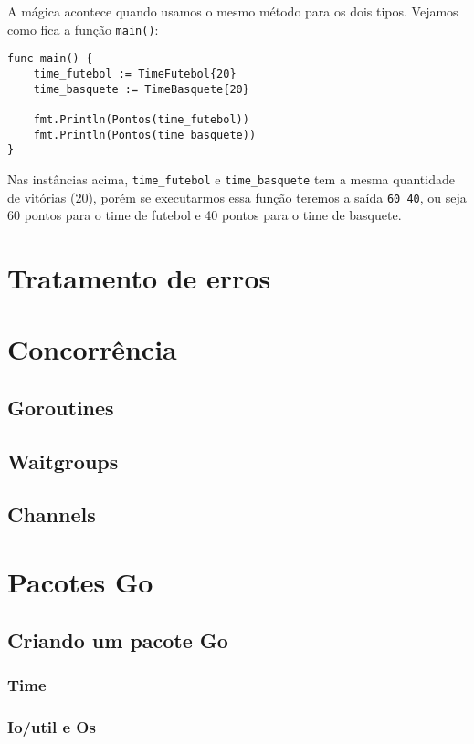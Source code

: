 \documentclass{SBCbookchapter}
\begin{document}
A mágica acontece quando usamos o mesmo método para os dois tipos. Vejamos como fica a função \texttt{main()}:

\begin{lstlisting}
func main() {
	time_futebol := TimeFutebol{20}
	time_basquete := TimeBasquete{20}
	
	fmt.Println(Pontos(time_futebol))
	fmt.Println(Pontos(time_basquete))
}
\end{lstlisting}

\label{duck}

Nas instâncias acima, \texttt{time\_futebol} e \texttt{time\_basquete} tem a mesma quantidade de vitórias (20), porém se executarmos essa função teremos a saída \texttt{60 40}, ou seja 60 pontos para o time de futebol e 40 pontos para o time de basquete.



\section{Tratamento de erros}

\section{Concorrência}
\subsection{Goroutines}
\subsection{Waitgroups}
\subsection{Channels}

\section{Pacotes Go}
\subsection{Criando um pacote Go}
\subsubsection{Time}
\subsubsection{Io/util e Os}
\end{document}

